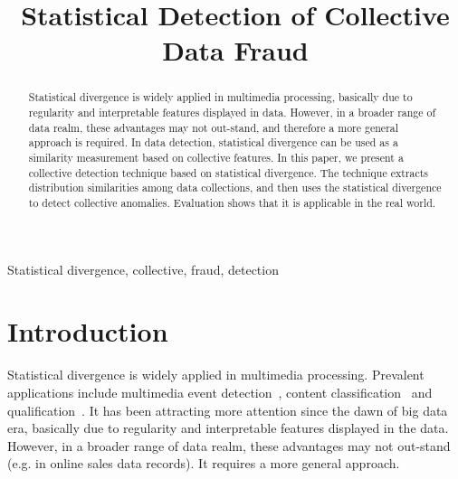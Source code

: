 \documentclass{article}
\begin{document}
\sloppy

	\def\x{{\mathbf x}}
	\def\L{{\cal L}}
	
	
	\title{Statistical Detection of Collective Data Fraud}
	\address{}
	
	
	\maketitle
	
	\begin{abstract}
		Statistical divergence is widely applied in multimedia processing, basically due to regularity and interpretable features displayed in data. However, in a broader range of data realm, these advantages may not out-stand, and therefore a more general approach is required. In data detection, statistical divergence can be used as a similarity measurement based on collective features.
		In this paper, we present a collective detection technique based on statistical divergence.
		The technique extracts distribution similarities among data collections, and then uses the statistical divergence to detect collective anomalies.
		Evaluation shows that it is applicable in the real world. 
	\end{abstract}
	
	\begin{keywords}
		Statistical divergence, collective, fraud, detection
	\end{keywords}
	
	\section{Introduction}
		\label{sec:intro}
		Statistical divergence is widely applied in multimedia processing. Prevalent applications include multimedia event detection~\cite{amid2014unsupervised}, content classification~\cite{moreno2004kullback,park2005classification} and qualification~\cite{pheng2016kullback,goldberger2003efficient}. It has been attracting more attention since the dawn of big data era, basically due to regularity and interpretable features displayed in the data. However, in a broader range of data realm, these advantages may not out-stand (e.g. in online sales data records). It requires a more general approach.
		
\end{document}
